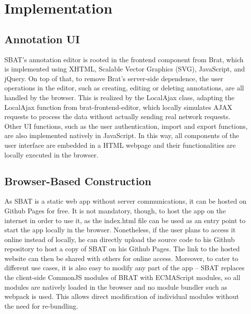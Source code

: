 \documentclass[12ptm a4paper]{article}
\begin{document}
\newpage
\section{Implementation}
\subsection{Annotation UI}
SBAT's annotation editor is rooted in the frontend component from Brat, which is implemented using XHTML, Scalable Vector Graphics (SVG), JavaScript, and jQuery. On top of that, to remove Brat's server-side dependence, the user operations in the editor, such as creating, editing or deleting annotations, are all handled by the browser. This is realized by the LocalAjax class, adapting the LocalAjax function from brat-frontend-editor, which locally simulates AJAX requests to process the data without actually sending real network requests. Other UI functions, such as the user authentication, import and export functions, are also implemented natively in JavaScript. In this way, all components of the user interface are embedded in a HTML webpage and their functionalities are locally executed in the browser.
\subsection{Browser-Based Construction}
As SBAT is a static web app without server communications, it can be hosted on Github Pages for free. It is not mandatory, though, to host the app on the internet in order to use it, as the index.html file can be used as an entry point to start the app locally in the browser. Nonetheless, if the user plans to access it online instead of locally, he can directly upload the source code to his Github repository to host a copy of SBAT on his Github Pages. The link to the hosted website can then be shared with others for online access. Moreover, to cater to different use cases, it is also easy to modify any part of the app -- SBAT replaces the client-side CommonJS modules of BRAT with ECMAScript modules, so all modules are natively loaded in the browser and no module bundler such as webpack is used. This allows direct modification of individual modules without the need for re-bundling.
\end{document}
